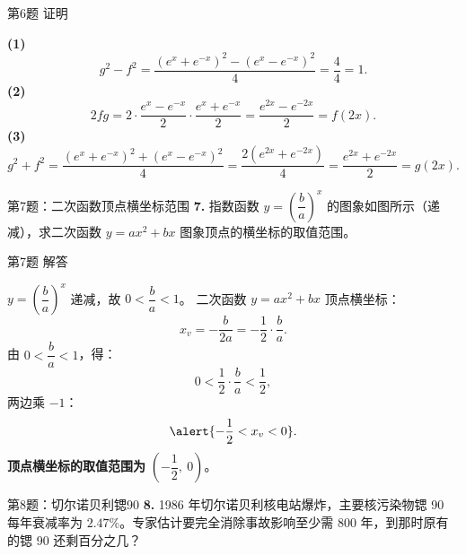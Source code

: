 \documentclass[10pt,aspectratio=169,serif]{beamer}
\begin{document}
\begin{frame}[t]{第6题 证明}
\begin{tcolorbox}[colback=orange!10,colframe=orange,title=\textbf{证明}]
\textbf{(1)}
\[
g^{2}-f^{2}=\frac{(e^{x}+e^{-x})^{2}-(e^{x}-e^{-x})^{2}}{4}
=\frac{4}{4}=1.
\]
\textbf{(2)}
\[
2fg=2\cdot\frac{e^{x}-e^{-x}}{2}\cdot\frac{e^{x}+e^{-x}}{2}
=\frac{e^{2x}-e^{-2x}}{2}=f(2x).
\]
\textbf{(3)}
\[
g^{2}+f^{2}=\frac{(e^{x}+e^{-x})^{2}+(e^{x}-e^{-x})^{2}}{4}
=\frac{2(e^{2x}+e^{-2x})}{4}
=\frac{e^{2x}+e^{-2x}}{2}=g(2x).
\]
\end{tcolorbox}
\end{frame}

\begin{frame}[t]{第7题：二次函数顶点横坐标范围}
\textbf{7.} 指数函数 $y=\left(\dfrac{b}{a}\right)^{x}$ 的图象如图所示（递减），求二次函数 $y=ax^{2}+bx$ 图象顶点的横坐标的取值范围。
\smallskip
\begin{center}
\end{center}
\end{frame}

\begin{frame}[t]{第7题 解答}
\begin{tcolorbox}[colback=orange!10,colframe=orange,title=\textbf{解}]
$y=\left(\dfrac{b}{a}\right)^{x}$ 递减，故 $0<\dfrac{b}{a}<1$。
\smallskip
二次函数 $y=ax^{2}+bx$ 顶点横坐标：
\[
x_{v}=-\frac{b}{2a}=-\frac{1}{2}\cdot\frac{b}{a}.
\]
由 $0<\dfrac{b}{a}<1$，得：
\[
0<\frac{1}{2}\cdot\frac{b}{a}<\frac12,
\]
两边乘 $-1$：
\[
\alert{-\frac12<x_{v}<0}.
\]
\textbf{顶点横坐标的取值范围为 } $\left(-\dfrac12,\ 0\right)$。
\end{tcolorbox}
\end{frame}

\begin{frame}[t]{第8题：切尔诺贝利锶90}
\textbf{8.} 1986 年切尔诺贝利核电站爆炸，主要核污染物锶 90 每年衰减率为 $2.47\%$。专家估计要完全消除事故影响至少需 $800$ 年，到那时原有的锶 90 还剩百分之几？
\end{frame}
\end{document}
